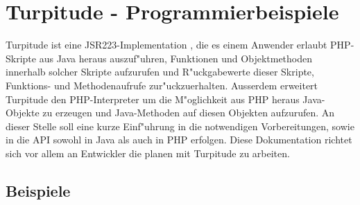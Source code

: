 \chapter{Turpitude - Programmierbeispiele}
\label{sec:app1}

Turpitude ist eine JSR223-Implementation \cite{JSRHP}, die es einem Anwender erlaubt PHP-Skripte
aus Java heraus auszuf"uhren, Funktionen und Objektmethoden innerhalb solcher Skripte aufzurufen
und R"uckgabewerte dieser Skripte, Funktions- und Methodenaufrufe zur"uckzuerhalten.
Ausserdem erweitert Turpitude den PHP-Interpreter um die M"oglichkeit aus PHP heraus
Java-Objekte zu erzeugen und Java-Methoden auf diesen Objekten aufzurufen.
An dieser Stelle soll eine kurze Einf"uhrung in die notwendigen Vorbereitungen, sowie
in die API sowohl in Java als auch in PHP erfolgen.
Diese Dokumentation richtet sich vor allem an Entwickler die planen mit Turpitude zu arbeiten.



\section{Beispiele}









